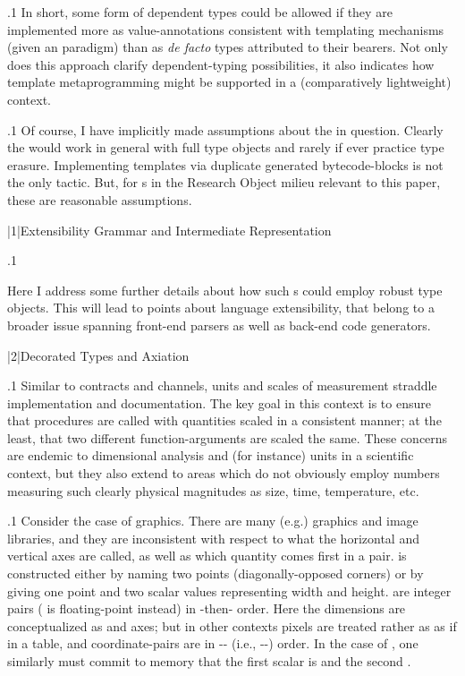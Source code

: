 \documentclass[11pt, twocolumn]{article}
\begin{document}
\p.1{%
In short, some form of dependent
types could be allowed if they are
implemented more as value-annotations
consistent with templating mechanisms
(given an  paradigm)
than as \textit{de facto} types attributed to their bearers.
Not only does this approach clarify
dependent-typing possibilities, it also
indicates how template metaprogramming
might be supported in a (comparatively lightweight)  context.\enlargethispage{1em}
}%

\p.1{%
Of course, I have implicitly
made assumptions about the
 in question. Clearly the
 would work in general with
full type objects and rarely
if ever practice type erasure.
Implementing templates
via duplicate generated bytecode-blocks
is not the only tactic. But,
for s in the Research Object
milieu relevant to this paper,
these are reasonable assumptions.\upAdj{2pt}
}%


\s|1|{Extensibility \Visavis{} Grammar and Intermediate Representation}

\p.1{%
\upAdj{18.5pt}\par{}Here I address some further details about how
such s could employ robust type objects.
This will lead to points about language
extensibility, that belong to a broader
issue spanning front-end parsers as well
as back-end code generators.\newpage{}\upAdj{23pt}
}%


\s|2|{Decorated Types and Axiation}

\p.1{%
Similar to contracts and channels, units and scales of
measurement straddle implementation and documentation.
The key goal in this context is to ensure that
procedures are called with quantities scaled in a consistent
manner; at the least, that two different function-arguments
are scaled the same. These concerns are endemic
to dimensional analysis and (for instance)  units
in a scientific context, but they also extend to areas
which do not obviously employ numbers measuring such clearly physical
magnitudes as size, time, temperature, etc.
}%

\p.1{%
Consider the case of  graphics. There are many (e.g.)
 graphics and image libraries, and they are inconsistent
with respect to what the horizontal and vertical axes are
called, as well as which quantity comes first in a pair.
is constructed either by naming two points (diagonally-opposed
corners) or by giving one point and two scalar values representing
width and height.  are integer pairs ( is floating-point instead)
in -then- order. Here the dimensions are conceptualized
as  and  axes; but in other contexts pixels are treated
rather as  as if in a table, and coordinate-pairs
are in -- (i.e., --) order.
In the case of , one similarly must commit
to memory that the first scalar is  and the second .
}%
\end{document}
